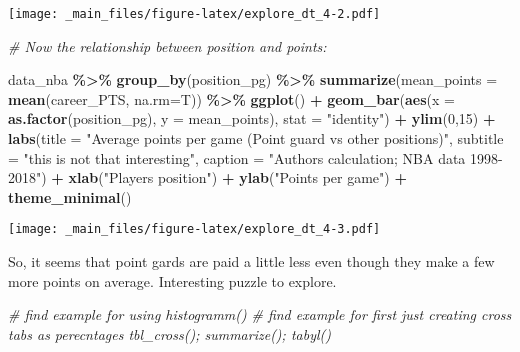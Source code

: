 \documentclass[
]{book}
\newenvironment{Shaded}{\begin{snugshade}}{\end{snugshade}}
\newcommand{\AttributeTok}[1]{\textcolor[rgb]{0.13,0.29,0.53}{#1}}
\newcommand{\CommentTok}[1]{\textcolor[rgb]{0.56,0.35,0.01}{\textit{#1}}}
\newcommand{\DecValTok}[1]{\textcolor[rgb]{0.00,0.00,0.81}{#1}}
\newcommand{\FunctionTok}[1]{\textcolor[rgb]{0.13,0.29,0.53}{\textbf{#1}}}
\newcommand{\NormalTok}[1]{#1}
\newcommand{\SpecialCharTok}[1]{\textcolor[rgb]{0.81,0.36,0.00}{\textbf{#1}}}
\newcommand{\StringTok}[1]{\textcolor[rgb]{0.31,0.60,0.02}{#1}}
\begin{document}
\texttt{[image: \_main\_files/figure-latex/explore\_dt\_4-2.pdf]}

\begin{Shaded}
\begin{Highlighting}[]
\CommentTok{\# Now the relationship between position and points:}

\NormalTok{data\_nba }\SpecialCharTok{\%\textgreater{}\%} 
  \FunctionTok{group\_by}\NormalTok{(position\_pg) }\SpecialCharTok{\%\textgreater{}\%}
  \FunctionTok{summarize}\NormalTok{(}\AttributeTok{mean\_points =} \FunctionTok{mean}\NormalTok{(career\_PTS, }\AttributeTok{na.rm=}\NormalTok{T)) }\SpecialCharTok{\%\textgreater{}\%}
  \FunctionTok{ggplot}\NormalTok{() }\SpecialCharTok{+}
  \FunctionTok{geom\_bar}\NormalTok{(}\FunctionTok{aes}\NormalTok{(}\AttributeTok{x =} \FunctionTok{as.factor}\NormalTok{(position\_pg), }
               \AttributeTok{y =}\NormalTok{ mean\_points),}
           \AttributeTok{stat =} \StringTok{"identity"}\NormalTok{) }\SpecialCharTok{+} 
  \FunctionTok{ylim}\NormalTok{(}\DecValTok{0}\NormalTok{,}\DecValTok{15}\NormalTok{) }\SpecialCharTok{+}
  \FunctionTok{labs}\NormalTok{(}\AttributeTok{title =} \StringTok{"Average points per game (Point guard vs other positions)"}\NormalTok{,}
       \AttributeTok{subtitle =} \StringTok{"this is not that interesting"}\NormalTok{,}
       \AttributeTok{caption =} \StringTok{"Authors\textquotesingle{} calculation; NBA data 1998{-}2018"}\NormalTok{) }\SpecialCharTok{+}
  \FunctionTok{xlab}\NormalTok{(}\StringTok{"Player\textquotesingle{}s position"}\NormalTok{) }\SpecialCharTok{+}
  \FunctionTok{ylab}\NormalTok{(}\StringTok{"Points per game"}\NormalTok{) }\SpecialCharTok{+}
  \FunctionTok{theme\_minimal}\NormalTok{()}
\end{Highlighting}
\end{Shaded}

\texttt{[image: \_main\_files/figure-latex/explore\_dt\_4-3.pdf]}

So, it seems that point gards are paid a little less even though they make a few more points on average. Interesting puzzle to explore.

\begin{Shaded}
\begin{Highlighting}[]
\CommentTok{\# find example for using histogramm()}
\CommentTok{\# find example for first just creating cross tabs as perecntages tbl\_cross(); summarize(); tabyl()}
\end{Highlighting}
\end{Shaded}
\end{document}
